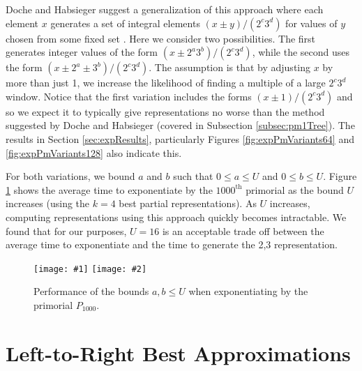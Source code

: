 \documentclass{ucalgthes1}
\theoremstyle{definition}
\newcommand{\mygraphTwoX}[5]{
	\begin{figure}[htb]
	\centering
	\texttt{[image: \#1]}
	\texttt{[image: \#2]}
	\caption[#5]{#4}
	\label{#3}
	\end{figure}
}
\begin{document}
Doche and Habsieger suggest a generalization of this approach where each element $x$ generates a set of integral elements $(x \pm y)/(2^c3^d)$ for values of $y$ chosen from some fixed set \cite[\S 5]{Doche2008}.  Here we consider two possibilities.  The first generates integer values of the form $(x \pm 2^a3^b)/(2^c3^d)$, while the second uses the form $(x \pm 2^a \pm 3^b) / (2^c 3^d)$.  The assumption is that by adjusting $x$ by more than just 1, we increase the likelihood of finding a multiple of a large $2^c3^d$ window.  Notice that the first variation includes the forms $(x \pm 1)/(2^c 3^d)$ and so we expect it to typically give representations no worse than the method suggested by Doche and Habsieger \cite{Doche2008} (covered in Subsection \ref{subsec:pm1Tree}).  The results in Section \ref{sec:expResults}, particularly Figures \ref{fig:expPmVariants64} and \ref{fig:expPmVariants128} also indicate this.

For both variations, we bound $a$ and $b$ such that $0 \le a \le U$ and $0 \le b \le U$.  Figure \ref{fig:pm2a3bVaryMax} shows the average time to exponentiate by the $1000^{\textrm{th}}$ primorial as the bound $U$ increases (using the $k=4$ best partial representations).  As $U$ increases, computing representations using this approach quickly becomes intractable.  We found that for our purposes, $U=16$ is an acceptable trade off between the average time to exponentiate and the time to generate the 2,3 representation.

\mygraphTwoX{pm2a3b_vary_max-64}{pm2a3b_vary_max-128}{fig:pm2a3bVaryMax}{Performance of the bounds $a, b \le U$ when exponentiating by the primorial $P_{1000}$.}{Global Bounds on Pruned Trees.}

\clearpage


\section{Left-to-Right Best Approximations}
\label{sec:expBestApproximations}


\end{document}

